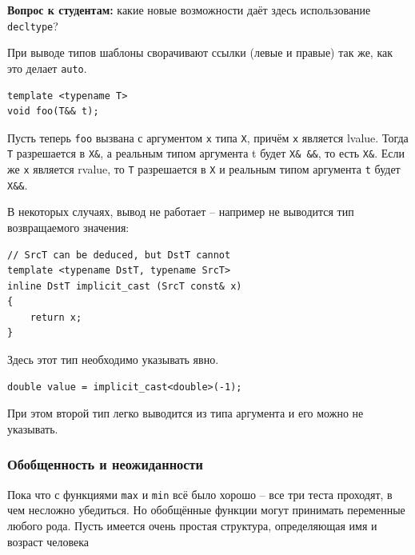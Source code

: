 \documentclass[a4paper,12pt,oneside]{article}
\newif\ifanswers
\begin{document}
\textbf{Вопрос к студентам:} какие новые возможности даёт здесь использование \lstinline!decltype!?

\ifanswers
Правильный ответ: способ довольно очевиден.

\begin{lstlisting}
template <typename Func>
auto deduce(const Func & f) -> decltype(f())
\end{lstlisting}

В данном случае типом возвращаемого значения для \lstinline!deduce(f)! будет \lstinline!void!
\fi 

При выводе типов шаблоны сворачивают ссылки (левые и правые) так же, как это делает \lstinline!auto!.

\begin{lstlisting}
template <typename T>
void foo(T&& t);
\end{lstlisting}

Пусть теперь \lstinline!foo! вызвана с аргументом \lstinline!x! типа \lstinline!X!, причём \lstinline!x! является lvalue. Тогда \lstinline!T! разрешается в \lstinline!X&!, а реальным типом аргумента t будет \lstinline!X& &&!, то есть \lstinline!X&!. Если же \lstinline!x! является rvalue, то \lstinline!T! разрешается в \lstinline!X! и реальным типом аргумента \lstinline!t! будет \lstinline!X&&!.

В некоторых случаях, вывод не работает -- например не выводится тип возвращаемого значения:

\begin{lstlisting}
// SrcT can be deduced, but DstT cannot 
template <typename DstT, typename SrcT> 
inline DstT implicit_cast (SrcT const& x)  
{ 
    return x; 
} 
\end{lstlisting}

Здесь этот тип необходимо указывать явно.

\begin{lstlisting}
double value = implicit_cast<double>(-1); 
\end{lstlisting}

При этом второй тип легко выводится из типа аргумента и его можно не указывать.

\subsubsection{Обобщенность и неожиданности}\label{GenericCode}

Пока что с функциями \lstinline!max! и \lstinline!min! всё было хорошо -- все три теста проходят, в чем несложно убедиться. Но обобщённые функции могут принимать переменные любого рода. Пусть имеется очень простая структура, определяющая имя и возраст человека
\end{document}
